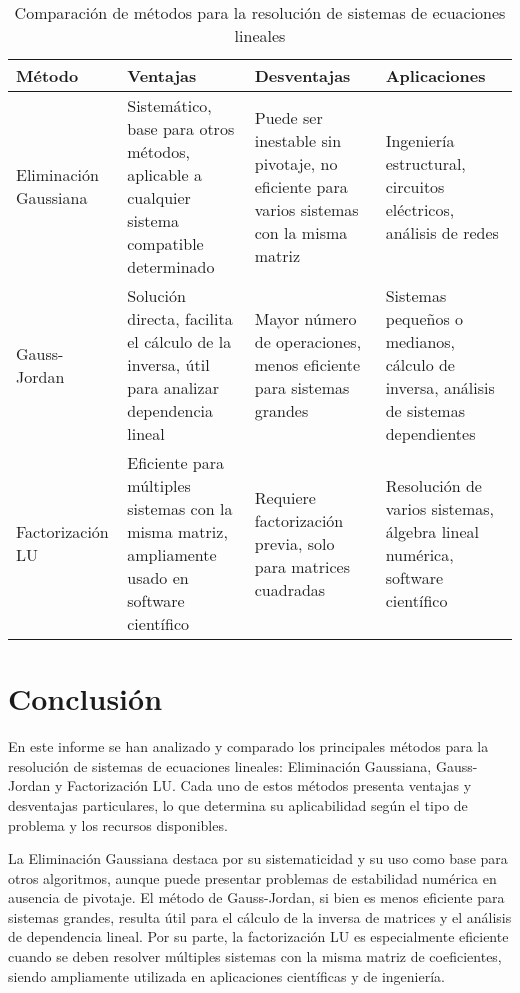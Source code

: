 \documentclass[12pt]{article}
\begin{document}
\begin{table}[h!]
\centering
\begin{tabular}{|l|p{3cm}|p{3cm}|p{3cm}|}
\hline
\textbf{Método} & \textbf{Ventajas} & \textbf{Desventajas} & \textbf{Aplicaciones} \\
\hline
Eliminación Gaussiana & Sistemático, base para otros métodos, aplicable a cualquier sistema compatible determinado & Puede ser inestable sin pivotaje, no eficiente para varios sistemas con la misma matriz & Ingeniería estructural, circuitos eléctricos, análisis de redes \\
\hline
Gauss-Jordan & Solución directa, facilita el cálculo de la inversa, útil para analizar dependencia lineal & Mayor número de operaciones, menos eficiente para sistemas grandes & Sistemas pequeños o medianos, cálculo de inversa, análisis de sistemas dependientes \\
\hline
Factorización LU & Eficiente para múltiples sistemas con la misma matriz, ampliamente usado en software científico & Requiere factorización previa, solo para matrices cuadradas & Resolución de varios sistemas, álgebra lineal numérica, software científico \\
\hline
\end{tabular}
\caption{Comparación de métodos para la resolución de sistemas de ecuaciones lineales}
\end{table}

\section{Conclusión}

En este informe se han analizado y comparado los principales métodos para la resolución de sistemas de ecuaciones lineales: Eliminación Gaussiana, Gauss-Jordan y Factorización LU. Cada uno de estos métodos presenta ventajas y desventajas particulares, lo que determina su aplicabilidad según el tipo de problema y los recursos disponibles.

La Eliminación Gaussiana destaca por su sistematicidad y su uso como base para otros algoritmos, aunque puede presentar problemas de estabilidad numérica en ausencia de pivotaje. El método de Gauss-Jordan, si bien es menos eficiente para sistemas grandes, resulta útil para el cálculo de la inversa de matrices y el análisis de dependencia lineal. Por su parte, la factorización LU es especialmente eficiente cuando se deben resolver múltiples sistemas con la misma matriz de coeficientes, siendo ampliamente utilizada en aplicaciones científicas y de ingeniería.
\end{document}
